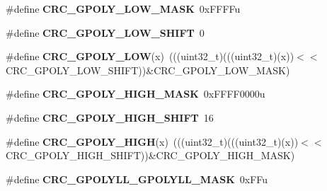 \begin{DoxyCompactItemize}
\item 
\#define {\bfseries C\+R\+C\+\_\+\+G\+P\+O\+L\+Y\+\_\+\+L\+O\+W\+\_\+\+M\+A\+SK}~0x\+F\+F\+F\+Fu\hypertarget{group__CRC__Register__Masks_ga861d4f6f458051a63a7b01e6e5d8794b}{}\label{group__CRC__Register__Masks_ga861d4f6f458051a63a7b01e6e5d8794b}

\item 
\#define {\bfseries C\+R\+C\+\_\+\+G\+P\+O\+L\+Y\+\_\+\+L\+O\+W\+\_\+\+S\+H\+I\+FT}~0\hypertarget{group__CRC__Register__Masks_ga3830f95399bd5190027aaf00f307d10b}{}\label{group__CRC__Register__Masks_ga3830f95399bd5190027aaf00f307d10b}

\item 
\#define {\bfseries C\+R\+C\+\_\+\+G\+P\+O\+L\+Y\+\_\+\+L\+OW}(x)~(((uint32\+\_\+t)(((uint32\+\_\+t)(x))$<$$<$C\+R\+C\+\_\+\+G\+P\+O\+L\+Y\+\_\+\+L\+O\+W\+\_\+\+S\+H\+I\+FT))\&C\+R\+C\+\_\+\+G\+P\+O\+L\+Y\+\_\+\+L\+O\+W\+\_\+\+M\+A\+SK)\hypertarget{group__CRC__Register__Masks_ga66c5ae199c9bb4ee3951fea40d201c27}{}\label{group__CRC__Register__Masks_ga66c5ae199c9bb4ee3951fea40d201c27}

\item 
\#define {\bfseries C\+R\+C\+\_\+\+G\+P\+O\+L\+Y\+\_\+\+H\+I\+G\+H\+\_\+\+M\+A\+SK}~0x\+F\+F\+F\+F0000u\hypertarget{group__CRC__Register__Masks_ga96c07e55f3d3c43d7b3e7637bc854ed6}{}\label{group__CRC__Register__Masks_ga96c07e55f3d3c43d7b3e7637bc854ed6}

\item 
\#define {\bfseries C\+R\+C\+\_\+\+G\+P\+O\+L\+Y\+\_\+\+H\+I\+G\+H\+\_\+\+S\+H\+I\+FT}~16\hypertarget{group__CRC__Register__Masks_ga991debc471e54dcf5297d6a42c5778e6}{}\label{group__CRC__Register__Masks_ga991debc471e54dcf5297d6a42c5778e6}

\item 
\#define {\bfseries C\+R\+C\+\_\+\+G\+P\+O\+L\+Y\+\_\+\+H\+I\+GH}(x)~(((uint32\+\_\+t)(((uint32\+\_\+t)(x))$<$$<$C\+R\+C\+\_\+\+G\+P\+O\+L\+Y\+\_\+\+H\+I\+G\+H\+\_\+\+S\+H\+I\+FT))\&C\+R\+C\+\_\+\+G\+P\+O\+L\+Y\+\_\+\+H\+I\+G\+H\+\_\+\+M\+A\+SK)\hypertarget{group__CRC__Register__Masks_ga7e1477223f91dd35945f2f5895a346c5}{}\label{group__CRC__Register__Masks_ga7e1477223f91dd35945f2f5895a346c5}

\item 
\#define {\bfseries C\+R\+C\+\_\+\+G\+P\+O\+L\+Y\+L\+L\+\_\+\+G\+P\+O\+L\+Y\+L\+L\+\_\+\+M\+A\+SK}~0x\+F\+Fu\hypertarget{group__CRC__Register__Masks_ga659c987f1e9d74e32d16e4b69bd763ee}{}\label{group__CRC__Register__Masks_ga659c987f1e9d74e32d16e4b69bd763ee}


\end{DoxyCompactItemize}
